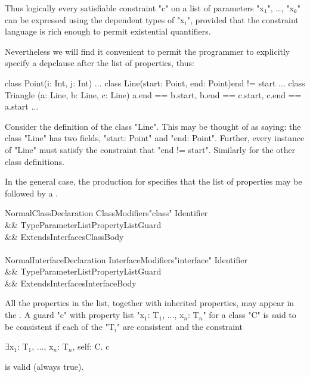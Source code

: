Thus logically every satisfiable constraint \xcd"c" on a list of parameters
\xcdmath"x$_1$", \dots, \xcdmath"x$_k$"
can be expressed using the dependent types of 
\xcdmath"x$_i$", provided
that the constraint language is rich enough to permit existential
quantifiers.

Nevertheless we will find it convenient to permit the programmer to
explicitly specify a depclause after the list of properties, thus:
\begin{xten}
class Point(i: Int, j: Int) { ... }
class Line(start: Point, end: Point){end != start} { ... }
class Triangle (a: Line, b: Line, c: Line)
   {a.end == b.start,  b.end == c.start,
    c.end == a.start} { ... }
\end{xten}

Consider the definition of the class \xcd"Line". This may be thought of as
saying: the class \xcd"Line" has two fields, \xcd"start: Point" and
\xcd"end: Point".
Further, every instance of \xcd"Line" must satisfy the constraint that
\xcd"end != start". Similarly for the other class definitions. 

In the general case, the production for 
specifies that the list of properties may be followed by a
.

\begin{grammar}
NormalClassDeclaration \:
      ClassModifiers\opt \xcd"class" Identifier  \\
   && TypeParameterList\opt PropertyList\opt Guard\opt \\
   && Extends\opt Interfaces\opt ClassBody \\
\\
NormalInterfaceDeclaration \:
      InterfaceModifiers\opt \xcd"interface" Identifier  \\
   && TypeParameterList\opt PropertyList\opt Guard\opt \\
   && ExtendsInterfaces\opt InterfaceBody \\
\end{grammar}

All the properties in the list, together with inherited properties,
may appear in the . A guard \xcd"c" with
property list \xcdmath"x$_1$: T$_1$, $\dots$, x$_n$: T$_n$"
for a class \xcd"C" is said to be consistent if each of the \xcdmath"T$_i$" are
consistent and the constraint
\begin{xtenmath}
$\exists$x$_1$: T$_1$, $\dots$, x$_n$: T$_n$, self: C. c
\end{xtenmath}
\noindent is valid (always true).

